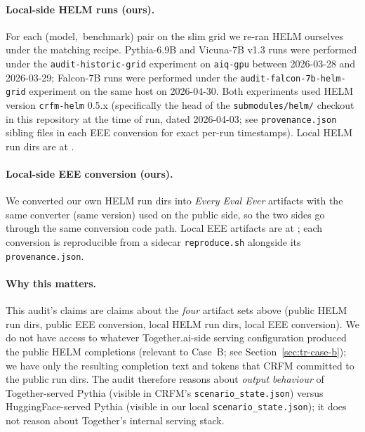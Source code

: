 \documentclass[11pt]{article}
\newcommand{\eee}{\textit{Every Eval Ever}\xspace}
\begin{document}
\paragraph{Local-side HELM runs (ours).}
For each \mbox{(model, benchmark)} pair on the slim grid we re-ran
  HELM ourselves under the matching recipe.
Pythia-6.9B and Vicuna-7B v1.3 runs were performed under the
  \texttt{audit-historic-grid} experiment on
  \texttt{aiq-gpu} between 2026-03-28 and 2026-03-29;
  Falcon-7B runs were performed under the
  \texttt{audit-falcon-7b-helm-grid} experiment on the same host
  on 2026-04-30.
Both experiments used HELM version \texttt{crfm-helm} 0.5.x
  (specifically the head of the \texttt{submodules/helm/} checkout
  in this repository at the time of run, dated 2026-04-03; see
  \texttt{provenance.json} sibling files in each EEE conversion
  for exact per-run timestamps).
Local HELM run dirs are at
  .

\paragraph{Local-side EEE conversion (ours).}
We converted our own HELM run dirs into \eee{} artifacts with the
  same  converter (same
  version) used on the public side, so the two sides go through the
  same conversion code path.
Local EEE artifacts are at
  ;
  each conversion is reproducible from a sidecar \texttt{reproduce.sh}
  alongside its \texttt{provenance.json}.

\paragraph{Why this matters.}
This audit's claims are claims about the \emph{four} artifact sets
  above (public HELM run dirs, public EEE conversion, local HELM run
  dirs, local EEE conversion).
We do not have access to whatever Together.ai-side serving
  configuration produced the public HELM completions
  (relevant to Case~B; see Section~\ref{sec:tr-case-b}); we have only
  the resulting completion text and tokens that CRFM committed to the
  public run dirs.
The audit therefore reasons about \emph{output behaviour} of
  Together-served Pythia (visible in CRFM's
  \texttt{scenario\_state.json}) versus HuggingFace-served Pythia
  (visible in our local \texttt{scenario\_state.json}); it does not
  reason about Together's internal serving stack.
\end{document}
